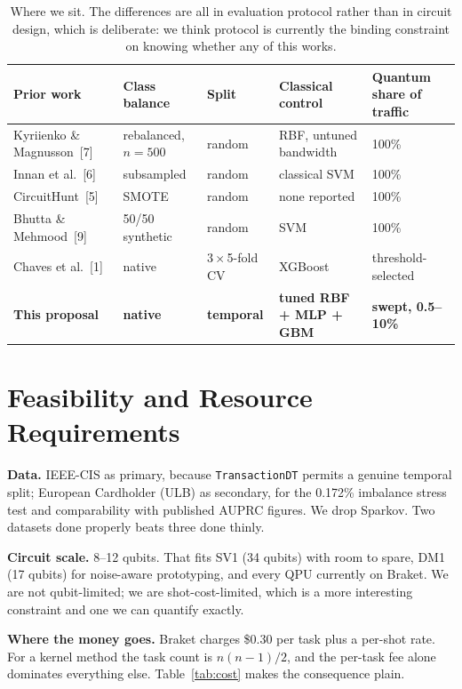 \documentclass[10pt,a4paper]{article}
\begin{document}
\begin{table}[h]
\small
\centering
\setlength{\tabcolsep}{4pt}
\begin{tabular}{@{}lllll@{}}
\toprule
Prior work & Class balance & Split & Classical control & Quantum share of traffic \\
\midrule
Kyriienko \& Magnusson~[7] & rebalanced, $n{=}500$ & random & RBF, untuned bandwidth & 100\% \\
Innan et al.~[6] & subsampled & random & classical SVM & 100\% \\
CircuitHunt~[5] & SMOTE & random & none reported & 100\% \\
Bhutta \& Mehmood~[9] & 50/50 synthetic & random & SVM & 100\% \\
Chaves et al.~[1] & native & $3\times$5-fold CV & XGBoost & threshold-selected \\
\textbf{This proposal} & \textbf{native} & \textbf{temporal} & \textbf{tuned RBF + MLP + GBM} & \textbf{swept, 0.5--10\%} \\
\bottomrule
\end{tabular}
\caption{\small Where we sit. The differences are all in evaluation protocol rather than in circuit design, which is deliberate: we think protocol is currently the binding constraint on knowing whether any of this works.}
\end{table}

\section{Feasibility and Resource Requirements}

\textbf{Data.} IEEE-CIS as primary, because \texttt{TransactionDT} permits a genuine temporal split; European Cardholder (ULB) as secondary, for the 0.172\% imbalance stress test and comparability with published AUPRC figures. We drop Sparkov. Two datasets done properly beats three done thinly.

\textbf{Circuit scale.} 8--12 qubits. That fits SV1 (34 qubits) with room to spare, DM1 (17 qubits) for noise-aware prototyping, and every QPU currently on Braket. We are not qubit-limited; we are shot-cost-limited, which is a more interesting constraint and one we can quantify exactly.

\textbf{Where the money goes.} Braket charges \$0.30 per task plus a per-shot rate. For a kernel method the task count is $n(n{-}1)/2$, and the per-task fee alone dominates everything else. Table~\ref{tab:cost} makes the consequence plain.
\end{document}
